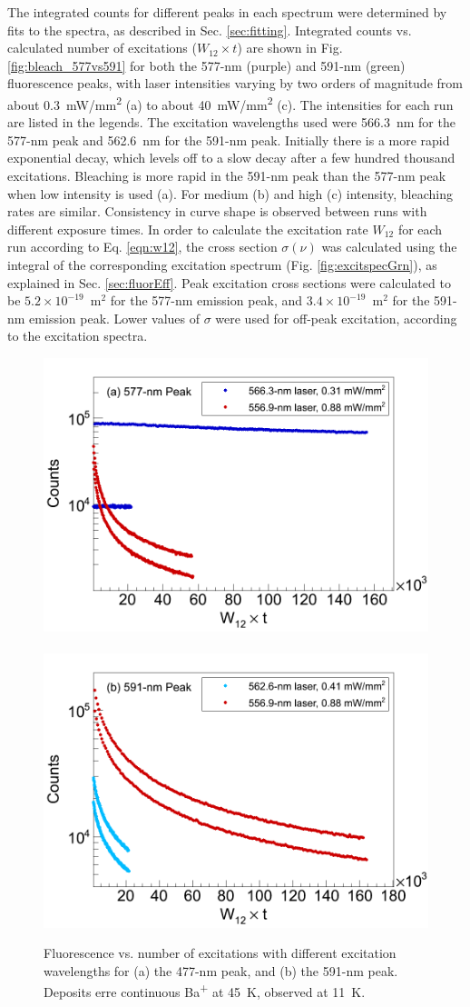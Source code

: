 The integrated counts for different peaks in each spectrum were determined by fits to the spectra, as described in Sec. \ref{sec:fitting}.  Integrated counts vs. calculated number of excitations ($W_{12} \times t$) are shown in Fig. \ref{fig:bleach_577vs591} for both the 577-nm (purple) and 591-nm (green) fluorescence peaks, with laser intensities varying by two orders of magnitude from about 0.3~mW/mm\textsuperscript{2} (a) to about 40~mW/mm\textsuperscript{2} (c).  The intensities for each run are listed in the legends.  The excitation wavelengths used were 566.3~nm for the 577-nm peak and 562.6~nm for the 591-nm peak.  Initially there is a more rapid exponential decay, which levels off to a slow decay after a few hundred thousand excitations.  Bleaching is more rapid in the 591-nm peak than the 577-nm peak when low intensity is used (a).  For medium (b) and high (c) intensity, bleaching rates are similar.  Consistency in curve shape is observed between runs with different exposure times.  In order to calculate the excitation rate $W_{12}$ for each run according to Eq. \ref{eqn:w12}, the cross section $\sigma(\nu)$ was calculated using the integral of the corresponding excitation spectrum (Fig. \ref{fig:excitspecGrn}), as explained in Sec. \ref{sec:fluorEff}.  Peak excitation cross sections were calculated to be $5.2 \times 10^{-19}$~m$^{2}$ for the 577-nm emission peak, and $3.4 \times 10^{-19}$~m$^{2}$ for the 591-nm emission peak.  Lower values of $\sigma$ were used for off-peak excitation, according to the excitation spectra.

\begin{figure} %
        \centering
                \includegraphics[width=.5\textwidth]{figures/bleach_compareExcitations_specificSigmas_a.png}
                ~
                \includegraphics[width=.5\textwidth]{figures/bleach_compareExcitations_specificSigmas_b.png}
                \caption{Fluorescence vs. number of excitations with different excitation wavelengths for (a) the 477-nm peak, and (b) the 591-nm peak.  Deposits erre continuous Ba\textsuperscript{+} at 45~K, observed at 11~K.}
\label{fig:bleach_excitCompare}
\end{figure}

